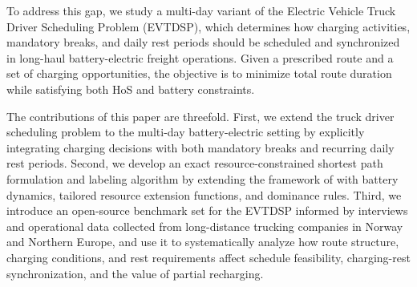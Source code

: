 \documentclass[3p,11pt,authoryear]{elsarticle}  %
\begin{document}
To address this gap, we study a multi-day variant of the Electric Vehicle Truck Driver Scheduling Problem (EVTDSP), which determines how charging activities, mandatory breaks, and daily rest periods should be scheduled and synchronized in long-haul battery-electric freight operations. Given a prescribed route and a set of charging opportunities, the objective is to minimize total route duration while satisfying both HoS and battery constraints.

The contributions of this paper are threefold. First, we extend the truck driver scheduling problem to the multi-day battery-electric setting by explicitly integrating charging decisions with both mandatory breaks and recurring daily rest periods. Second, we develop an exact resource-constrained shortest path formulation and labeling algorithm by extending the framework of \citet{goel2017exact} with battery dynamics, tailored resource extension functions, and dominance rules. %
Third, we introduce an open-source benchmark set for the EVTDSP informed by interviews and operational data collected from long-distance trucking companies in Norway and Northern Europe, and use it to systematically analyze how route structure, charging conditions, and rest requirements affect schedule feasibility, charging-rest synchronization, and the value of partial recharging.



\end{document}
